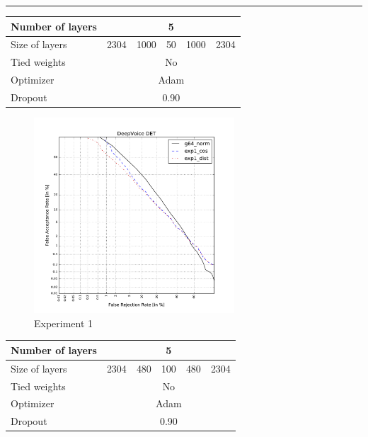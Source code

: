 \documentclass[conference]{IEEEtran}
\begin{document}
\hrule
\vspace{0.5cm}

\begin{table}[!h]
\centering
\begin{tabular}{|l|c|c|c|c|c|}
\hline
Number of layers & \multicolumn{5}{c|}{5}                \\ \hline
Size of layers   & 2304   & 1000   & 50  & 1000  & 2304  \\ \hline
Tied weights     & \multicolumn{5}{c|}{No}               \\ \hline
Optimizer        & \multicolumn{5}{c|}{Adam} \\ \hline
Dropout          & \multicolumn{5}{c|}{0.90} \\ \hline
\end{tabular}
\end{table}

\begin{figure}[!h]
    \centering
    \includegraphics[width=7.5cm]{../scores/det1.pdf}
    \captionsetup{labelformat=empty}
    \caption{Experiment 1}
\end{figure}


\newpage

\begin{table}[!h]
\centering
\begin{tabular}{|l|c|c|c|c|c|}
\hline
Number of layers & \multicolumn{5}{c|}{5}                \\ \hline
Size of layers   & 2304   & 480   & 100  & 480  & 2304   \\ \hline
Tied weights     & \multicolumn{5}{c|}{No}               \\ \hline
Optimizer        & \multicolumn{5}{c|}{Adam} \\ \hline
Dropout          & \multicolumn{5}{c|}{0.90} \\ \hline
\end{tabular}
\end{table}
\end{document}
